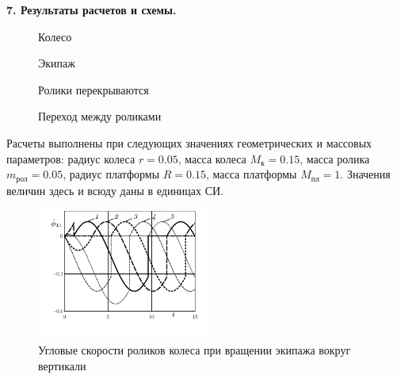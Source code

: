 % 

% 

% 

% 



{\bf 7. Результаты расчетов и схемы.}

\begin{figure}[H]
        \centering
        \caption{Колесо}
        \label{fig:wheel}
    \endminipage
        \centering
        \caption{Экипаж}
        \label{fig:vehicle}
    \endminipage
\end{figure}

\begin{figure}[H]
        \centering
        \caption{Ролики перекрываются}
        \label{fig:overlap}
    \endminipage
        \centering
        \caption{Переход между роликами}
        \label{fig:change}
    \endminipage
\end{figure}

Расчеты выполнены при следующих значениях геометрических и массовых параметров: радиус колеса $r = 0.05$, масса колеса $ M_{\text{к}} = 0.15$, масса ролика $m_{\text{рол}} = 0.05$, радиус платформы $R = 0.15$, масса платформы $M_{\text{пл}} = 1$. Значения величин здесь и всюду даны в единицах СИ.


\begin{figure}[H]
  \includegraphics[width=0.5\textwidth]{pic/figure5_1.pdf}
  \caption{Угловые скорости роликов колеса при вращении экипажа вокруг вертикали}\label{fig:selfrot}
\end{figure}

